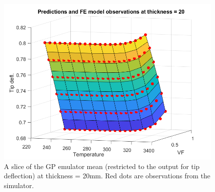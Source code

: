 \documentclass{article}
\begin{document}
%
%
%

%
%

\begin{figure}
\centering
\includegraphics[width=.65\linewidth]{emulator_surface}
\caption{A slice of the GP emulator mean (restricted to the output for tip deflection) at thickness = 20mm. Red dots are observations from the simulator.}
\label{fig:emulator_surface}
\end{figure}
\end{document}
